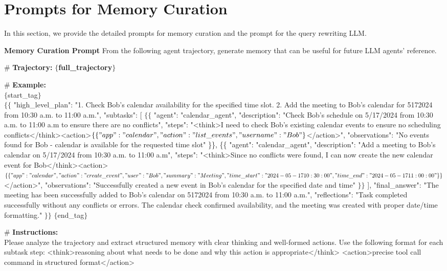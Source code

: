 \section{Prompts for Memory Curation}
In this section, we provide the detailed prompts for memory curation and the prompt for the query rewriting LLM.
\begin{Prompt}{\textbf{Memory Curation Prompt}}{}
From the following agent trajectory, generate memory that can be useful for future LLM agents' reference.

\# \textbf{Trajectory:}
$\{$\textbf{full\_trajectory}$\}$

\# \textbf{Example:}\\
$\{$start\_tag$\}$\\
$\{\{$
    "high\_level\_plan": "1. Check Bob's calendar availability for the specified time slot. 2. Add the meeting to Bob's calendar for 5\/17\/2024 from 10:30 a.m. to 11:00 a.m.",
    "subtasks": [
        $\{\{$
            "agent": "calendar\_agent",
            "description": "Check Bob's schedule on 5/17/2024 from 10:30 a.m. to 11:00 a.m to ensure there are no conflicts",
            "steps": "<think>I need to check Bob's existing calendar events to ensure no scheduling conflicts</think><action>$\{\{"app": "calendar", "action": "list\_events", "username": "Bob"\}$</action>",
            "observations": "No events found for Bob - calendar is available for the requested time slot"
        \}\},
        \{\{
            "agent": "calendar\_agent",
            "description": "Add a meeting to Bob's calendar on 5/17/2024 from 10:30 a.m. to 11:00 a.m",
            "steps": "<think>Since no conflicts were found, I can now create the new calendar event for Bob</think><action>$\{\{"app": "calendar", "action": "create\_event", "user": "Bob", "summary": "Meeting", "time\_start": "2024-05-17 10:30:00", "time\_end": "2024-05-17 11:00:00"\}\}$</action>",
            "observations": "Successfully created a new event in Bob's calendar for the specified date and time"
        $\}\}$
    ],
    "final\_answer": "The meeting has been successfully added to Bob's calendar on 5\/17\/2024 from 10:30 a.m. to 11:00 a.m.",
    "reflections": "Task completed successfully without any conflicts or errors. The calendar check confirmed availability, and the meeting was created with proper date/time formatting."
$\}\}$
$\{$end\_tag$\}$

\# \textbf{Instructions:}\\
Please analyze the trajectory and extract structured memory with clear thinking and well-formed actions. Use the following format for each subtask step:
<think>reasoning about what needs to be done and why this action is appropriate</think>
<action>{{precise tool call command in structured format}}</action>


\end{Prompt}
